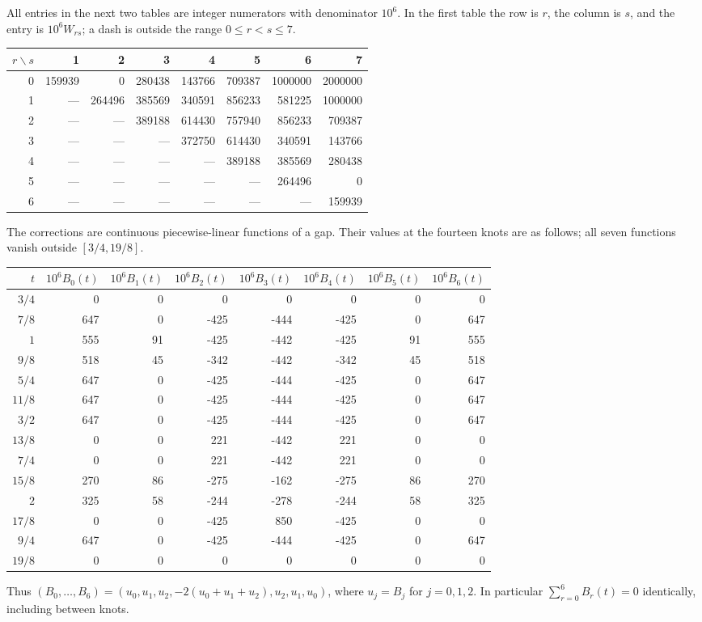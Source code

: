 \documentclass[11pt,reqno]{amsart}
\numberwithin{equation}{section}
\begin{document}
All entries in the next two tables are integer numerators with denominator
$10^6$. In the first table the row is $r$, the column is $s$, and the entry
is $10^6W_{rs}$; a dash is outside the range $0\le r<s\le7$.
\begin{center}
\small\setlength{\tabcolsep}{4pt}
\begin{tabular}{r*{7}{r}}
\toprule
$r\backslash s$&1&2&3&4&5&6&7\\\midrule
0&159939&0&280438&143766&709387&1000000&2000000\\
1&---&264496&385569&340591&856233&581225&1000000\\
2&---&---&389188&614430&757940&856233&709387\\
3&---&---&---&372750&614430&340591&143766\\
4&---&---&---&---&389188&385569&280438\\
5&---&---&---&---&---&264496&0\\
6&---&---&---&---&---&---&159939\\\bottomrule
\end{tabular}
\end{center}
The corrections are continuous piecewise-linear functions of a gap.
Their values at the fourteen knots are as follows; all seven functions
vanish outside $[3/4,19/8]$.
\begin{center}
\small\setlength{\tabcolsep}{5pt}
\begin{tabular}{r*{7}{r}}
\toprule
$t$&$10^6B_0(t)$&$10^6B_1(t)$&$10^6B_2(t)$&$10^6B_3(t)$&
$10^6B_4(t)$&$10^6B_5(t)$&$10^6B_6(t)$\\\midrule
$3/4$&0&0&0&0&0&0&0\\
$7/8$&647&0&-425&-444&-425&0&647\\
$1$&555&91&-425&-442&-425&91&555\\
$9/8$&518&45&-342&-442&-342&45&518\\
$5/4$&647&0&-425&-444&-425&0&647\\
$11/8$&647&0&-425&-444&-425&0&647\\
$3/2$&647&0&-425&-444&-425&0&647\\
$13/8$&0&0&221&-442&221&0&0\\
$7/4$&0&0&221&-442&221&0&0\\
$15/8$&270&86&-275&-162&-275&86&270\\
$2$&325&58&-244&-278&-244&58&325\\
$17/8$&0&0&-425&850&-425&0&0\\
$9/4$&647&0&-425&-444&-425&0&647\\
$19/8$&0&0&0&0&0&0&0\\\bottomrule
\end{tabular}
\end{center}
Thus $(B_0,\ldots,B_6)=(u_0,u_1,u_2,-2(u_0+u_1+u_2),
u_2,u_1,u_0)$, where $u_j=B_j$ for $j=0,1,2$. In particular
$\sum_{r=0}^6B_r(t)=0$ identically, including between knots.
\end{document}
